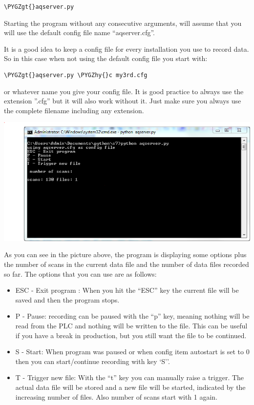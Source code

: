 \documentclass[a4paper,10pt,english]{sphinxmanual}
\def\PYGZgt{\char`\>}
\def\PYGZhy{\char`\-}
\begin{document}
\begin{Verbatim}[commandchars=\\\{\}]
\PYGZgt{}aqserver.py
\end{Verbatim}

Starting the program without any consecutive arguments, will assume that you will use the default config file name ``aqserver.cfg''.

It is a good idea to keep a config file for every installation you use to record data. So in this case when not using the default config file you start with:

\begin{Verbatim}[commandchars=\\\{\}]
\PYGZgt{}aqserver.py \PYGZhy{}c my3rd.cfg
\end{Verbatim}

or whatever name you give your config file. It is good practice to always use the extension ''.cfg'' but  it will also work without it. Just make sure you always use the complete filename including any extension.

{\hfill\includegraphics{usage1.png}\hfill}

As you can see in the picture above, the program is displaying some options plus the number of scans in the current data file and the number of data files recorded so far.
The options that you can use are as follows:
\begin{itemize}
\item {} 
ESC - Exit program : When you hit the ``ESC'' key the current file will be saved and then the program stops.

\item {} 
P - Pause: recording can be paused with the ``p'' key, meaning nothing will be read from the PLC and nothing will be written to the file. This can be useful if you have a break in production, but you still want the file to be continued.

\item {} 
S - Start: When program was paused or when config item autostart  is set to 0 then you can start/continue recording with  key `S''.

\item {} 
T - Trigger new file: With the ``t'' key you can manually raise a trigger. The actual data file will be stored and a new file will be started, indicated by the increasing number of files. Also number of scans start with 1 again.

\end{itemize}
\end{document}
